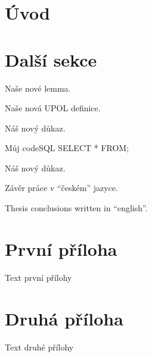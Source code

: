 \documentclass[12pt]{article}
\begin{document}
\maketitle

\section{Úvod}

\section{Další sekce}

\begin{uplemma}
Naše nové lemma.
\end{uplemma}


\begin{uptheorem}
Naše nová \gls{UPOL} definice.
\end{uptheorem}

\begin{upproof}
Náš nový důkaz.
\end{upproof}

\begin{upcode}{Můj code}{}{SQL}
SELECT * FROM;
\end{upcode}


\begin{upquote}
Náš nový důkaz. 
\end{upquote}

\upendofmainmatter

\begin{upconclusions}[czech]
Závěr práce v \enquote{českém} jazyce.
\end{upconclusions}

\begin{upconclusions}[english]
Thesis conclusions written in \enquote{english}.
\end{upconclusions}

\appendix
\section{První příloha}
Text první přílohy

\section{Druhá příloha}
Text druhé přílohy
\end{document}
